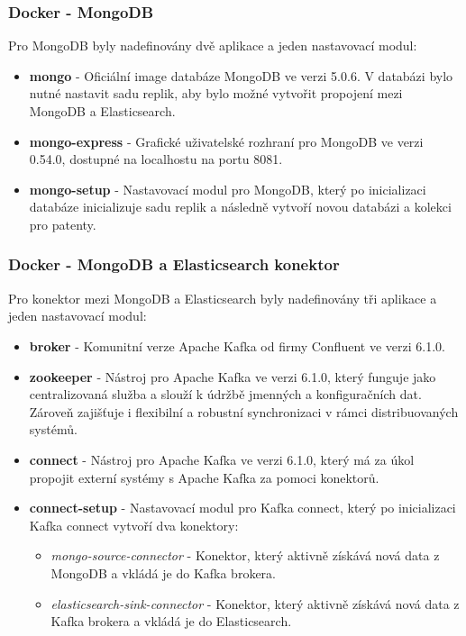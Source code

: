 \subsubsection{Docker - MongoDB}
Pro MongoDB byly nadefinovány dvě aplikace a jeden nastavovací modul:
\begin{itemize}
\item \textbf{mongo} - Oficiální image databáze MongoDB ve verzi 5.0.6. V databázi bylo nutné nastavit sadu replik, aby bylo možné vytvořit propojení mezi MongoDB a Elasticsearch.
\item \textbf{mongo-express} - Grafické uživatelské rozhraní pro MongoDB ve verzi 0.54.0, dostupné na localhostu na portu 8081.
\item \textbf{mongo-setup} - Nastavovací modul pro MongoDB, který po inicializaci databáze inicializuje sadu replik a následně vytvoří novou databázi a kolekci pro patenty.
\end{itemize}

\subsubsection{Docker - MongoDB a Elasticsearch konektor}
Pro konektor mezi MongoDB a Elasticsearch byly nadefinovány tři aplikace a jeden nastavovací modul:
\begin{itemize}
\item \textbf{broker} - Komunitní verze Apache Kafka od firmy Confluent ve verzi 6.1.0.
\item \textbf{zookeeper} - Nástroj pro Apache Kafka ve verzi 6.1.0, který funguje jako centralizovaná služba a slouží k údržbě jmenných a konfiguračních dat. Zároveň zajišťuje i flexibilní a robustní synchronizaci v rámci distribuovaných systémů.
\item \textbf{connect} - Nástroj pro Apache Kafka ve verzi 6.1.0, který má za úkol propojit externí systémy s Apache Kafka za pomoci konektorů.
\item \textbf{connect-setup} - Nastavovací modul pro Kafka connect, který po inicializaci Kafka connect vytvoří dva konektory:
	\begin{itemize}
	\item \textit{mongo-source-connector} - Konektor, který aktivně získává nová data z MongoDB a vkládá je do Kafka brokera.
	\item \textit{elasticsearch-sink-connector} - Konektor, který aktivně získává nová data z Kafka brokera a vkládá je do Elasticsearch.
	\end{itemize} 
\end{itemize}

